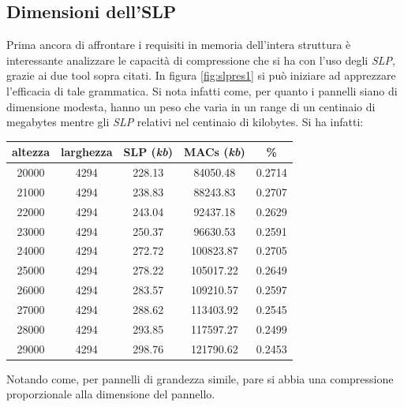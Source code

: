 \subsection{Dimensioni dell'SLP}
Prima ancora di affrontare i requisiti
in memoria dell'intera struttura è interessante analizzare le capacità di
compressione che si ha con l'uso degli \textit{SLP}, grazie ai due tool sopra
citati. In figura \ref{fig:slpres1} si può iniziare ad apprezzare l'efficacia di
tale grammatica. Si nota infatti come, per quanto i pannelli siano di dimensione
modesta, hanno un peso che varia in un range di un centinaio di megabytes mentre
gli \textit{SLP} relativi nel centinaio di kilobytes. Si ha infatti:
\begin{table}[H]
  \centering
  \begin{tabular}{c|c|c|c|c}
    \textbf{altezza} & \textbf{larghezza} & \textbf{SLP (\textit{kb})}
    & \textbf{MACs (\textit{kb})} & \textbf{\%}\\
    \hline
    20000 & 4294 & 228.13 & 84050.48 & 0.2714\\
    21000 & 4294 & 238.83 & 88243.83 & 0.2707\\
    22000 & 4294 & 243.04 & 92437.18 & 0.2629\\
    23000 & 4294 & 250.37 & 96630.53 & 0.2591\\
    24000 & 4294 & 272.72 & 100823.87 & 0.2705\\
    25000 & 4294 & 278.22 & 105017.22 & 0.2649\\
    26000 & 4294 & 283.57 & 109210.57 & 0.2597\\
    27000 & 4294 & 288.62 & 113403.92 & 0.2545\\
    28000 & 4294 & 293.85 & 117597.27 & 0.2499\\
    29000 & 4294 & 298.76 & 121790.62 & 0.2453\\
  \end{tabular}
\end{table}
Notando come, per pannelli di grandezza simile, pare si abbia una compressione
proporzionale alla dimensione del pannello.\\

